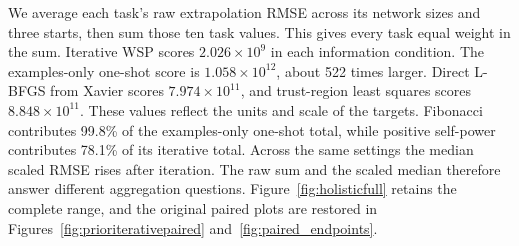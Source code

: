 We average each task's raw extrapolation RMSE across its network sizes and three starts, then sum those ten task values. This gives every task equal weight in the sum. Iterative WSP scores $2.026\times10^9$ in each information condition. The examples-only one-shot score is $1.058\times10^{12}$, about 522 times larger. Direct L-BFGS from Xavier scores $7.974\times10^{11}$, and trust-region least squares scores $8.848\times10^{11}$. These values reflect the units and scale of the targets. Fibonacci contributes 99.8\% of the examples-only one-shot total, while positive self-power contributes 78.1\% of its iterative total. Across the same settings the median scaled RMSE rises after iteration. The raw sum and the scaled median therefore answer different aggregation questions. Figure~\ref{fig:holisticfull} retains the complete range, and the original paired plots are restored in Figures~\ref{fig:prioriterativepaired} and~\ref{fig:paired_endpoints}.

